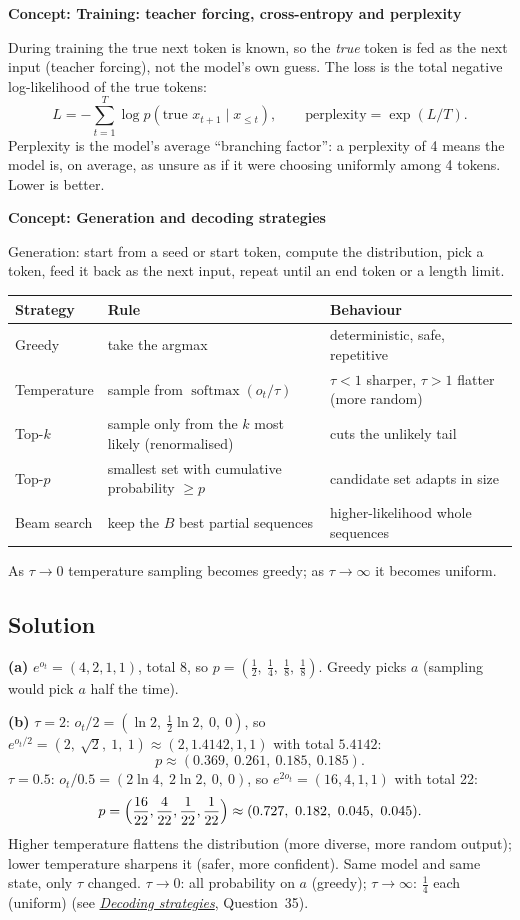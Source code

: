 \documentclass[12pt,a4paper]{article}
\newcommand{\concept}[2]{\par\medskip\phantomsection\label{#1}{\large\bfseries\color{blue!50!black} Concept: #2}\par}
\newcommand{\seeconcept}[3]{(see \hyperref[#1]{\textit{#2}}, Question~#3)}
\begin{document}
\concept{c:teacher}{Training: teacher forcing, cross-entropy and perplexity}
During training the true next token is known, so the \emph{true} token is fed as the next input (teacher forcing), not the model's own guess. The loss is the total negative log-likelihood of the true tokens:
\[
L=-\sum_{t=1}^T\log p(\text{true }x_{t+1}\mid x_{\le t}),\qquad \text{perplexity}=\exp(L/T).
\]
Perplexity is the model's average ``branching factor'': a perplexity of 4 means the model is, on average, as unsure as if it were choosing uniformly among 4 tokens. Lower is better.

\concept{c:decoding}{Generation and decoding strategies}
Generation: start from a seed or start token, compute the distribution, pick a token, feed it back as the next input, repeat until an end token or a length limit.
\begin{center}
\begin{tabular}{@{}l>{\raggedright\arraybackslash}p{}>{\raggedright\arraybackslash}p{}@{}}
\toprule
Strategy & Rule & Behaviour\\
\midrule
Greedy & take the argmax & deterministic, safe, repetitive\\
Temperature & sample from $\operatorname{softmax}(o_t/\tau)$ & $\tau<1$ sharper, $\tau>1$ flatter (more random)\\
Top-$k$ & sample only from the $k$ most likely (renormalised) & cuts the unlikely tail\\
Top-$p$ & smallest set with cumulative probability $\ge p$ & candidate set adapts in size\\
Beam search & keep the $B$ best partial sequences & higher-likelihood whole sequences\\
\bottomrule
\end{tabular}
\end{center}
As $\tau\to0$ temperature sampling becomes greedy; as $\tau\to\infty$ it becomes uniform.

\subsection*{Solution}
\textbf{(a)} $e^{o_t}=(4,2,1,1)$, total 8, so $p=(\tfrac12,\ \tfrac14,\ \tfrac18,\ \tfrac18)$. Greedy picks $a$ (sampling would pick $a$ half the time).

\textbf{(b)} $\tau=2$: $o_t/2=(\ln2,\ \tfrac12\ln2,\ 0,\ 0)$, so $e^{o_t/2}=(2,\ \sqrt2,\ 1,\ 1)\approx(2,1.4142,1,1)$ with total $5.4142$:
\[
p\approx(0.369,\ 0.261,\ 0.185,\ 0.185).
\]
$\tau=0.5$: $o_t/0.5=(2\ln4,\ 2\ln2,\ 0,\ 0)$, so $e^{2o_t}=(16,4,1,1)$ with total 22:
\[
p=\Bigl(\frac{16}{22},\frac4{22},\frac1{22},\frac1{22}\Bigr)\approx(0.727,\ 0.182,\ 0.045,\ 0.045).
\]
Higher temperature flattens the distribution (more diverse, more random output); lower temperature sharpens it (safer, more confident). Same model and same state, only $\tau$ changed. $\tau\to0$: all probability on $a$ (greedy); $\tau\to\infty$: $\tfrac14$ each (uniform) \seeconcept{c:decoding}{Decoding strategies}{35}.
\end{document}

